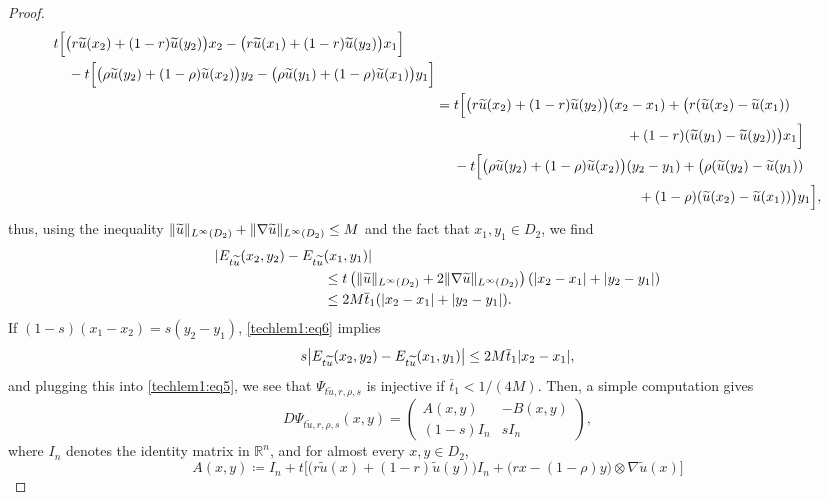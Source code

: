 \documentclass[JEP,XML,SOM,Unicode,published]{cedram}
\numberwithin{equation}{section}
\theoremstyle{plain}
\theoremstyle{definition}
\newcommand{\numberset}[1]{{\mathbb{#1}}}
\newcommand{\R}{\numberset{R}}
\let\ol\overline
\let\wt\widetilde
\newcommand{\Ren}{{\R^n}}
\newcommand{\grad}{\nabla}
\DeclarePairedDelimiter{\abs}{\lvert}{\rvert}
\DeclarePairedDelimiter{\norm}{\lVert}{\rVert}
\begin{document}
\begin{proof}
\begin{multline*}
\begin{aligned}
\begin{multlined}[t]
t\Big[\big(r\wt{u}(x_2)+(1-r)\wt{u}(y_2)\big)x_2-\big(r\wt{u}(x_1)+(1-r)\wt{u}(y_2)\big)x_1\Big]\\
-t\Big[\big(\rho \wt{u}(y_2)+(1-\rho)\wt{u}(x_2)\big)y_2-\big(\rho\wt{u}(y_1)
+(1-\rho)\wt{u}(x_1)\big)y_1\Big]\end{multlined}\\
&\begin{multlined}
=t\Big[\big(r\wt{u}(x_2)+(1-r)\wt{u}(y_2)\big)(x_2-x_1)
+\big(r(\wt{u}(x_2)-\wt{u}(x_1))\\+(1-r)(\wt{u}(y_1)-\wt{u}(y_2))\big)x_1\Big]\end{multlined}\\
&\begin{multlined}[b]
\hspace*{4.5mm}-t\Big[\big(\rho \wt{u}(y_2)+(1-\rho)\wt{u}(x_2)\big)(y_2-y_1)
+\big(\rho(\wt{u}(y_2)-\wt{u}(y_1))\\+(1-\rho)(\wt{u}(x_2)-\wt{u}(x_1))\big)y_1\Big]\end{multlined},
\end{aligned}
\end{multline*}
thus, using the inequality $\norm{\wt{u}}_{L^\infty(D_2)}+\norm{\grad\wt{u}}_{L^\infty(D_2)}\leq M$
and the fact that $x_1,y_1\in D_2$, we find\vspace*{-3pt}
\begin{equation}\label{techlem1:eq6}
\begin{split}
|E_{t\wt{u}}(x_2,y_2)-E_{t\wt{u}}&(x_1,y_1)|\\
&\leq t\left(\norm{\wt{u}}_{L^\infty(D_2)}+2\norm{\grad\wt{u}}_{L^\infty(D_2)}\right)
\left(\abs{x_2-x_1}+\abs{y_2-y_1}\right)\\
&\leq 2M\ol{t}_1(\abs{x_2-x_1}+\abs{y_2-y_1}).
\end{split}
\end{equation}
If $(1-s)(x_1-x_2)=s(y_2-y_1)$, \cref{techlem1:eq6} implies
\[
s\abs*{E_{t\wt{u}}(x_2,y_2)-E_{t\wt{u}}(x_1,y_1)}\leq 2M\ol{t}_1\abs{x_2-x_1},
\]
and plugging this into \cref{techlem1:eq5}, we see that $\Psi_{t\wt{u},r,\rho,s}$ is
injective if $\ol{t}_1<1/(4M)$. Then, a simple computation gives
\[
D\Psi_{t\wt{u},r,\rho,s}(x,y)
=\begin{pmatrix}
A(x,y) & -B(x,y)\\
(1-s) I_n & s I_n
\end{pmatrix},
\]
where $I_n$ denotes the identity matrix in $\Ren$, and for almost every $x,y\in D_2$,
\[
A(x,y)\coloneqq I_n+t\Big[\big(r\wt{u}(x)+(1-r)\wt{u}(y)\big)I_n+\big(rx-(1-\rho)y\big)\otimes
\grad \wt{u}(x)\Big]
\]
\end{proof}
\end{document}
